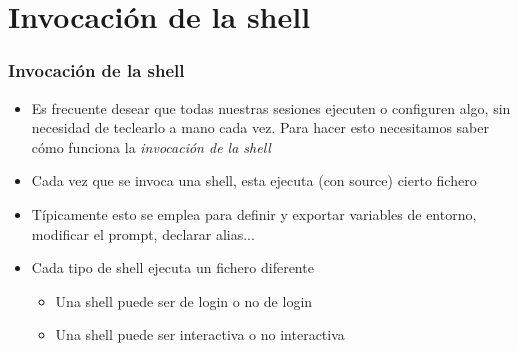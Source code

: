 \documentclass[ucs]{beamer}
\begin{document}
\section{Invocación de la shell}



\begin{frame}[fragile]
\frametitle{Invocación de la shell}
\begin{itemize}
\item
Es frecuente desear que todas nuestras sesiones ejecuten o configuren algo,
sin necesidad de teclearlo a mano cada vez. Para hacer esto necesitamos saber
cómo funciona la \emph{invocación de la shell}
\item
Cada vez que se invoca una shell, esta ejecuta (con source) cierto
fichero 
\item
Típicamente esto se emplea para definir y exportar variables de entorno, modificar
el prompt, declarar alias...
\item
Cada tipo de shell ejecuta un fichero diferente
\begin{itemize}
\item
Una shell puede ser de login o no de login
\item
Una shell puede ser interactiva o no interactiva
\end{itemize}
\end{itemize}

\end{frame}
\end{document}
